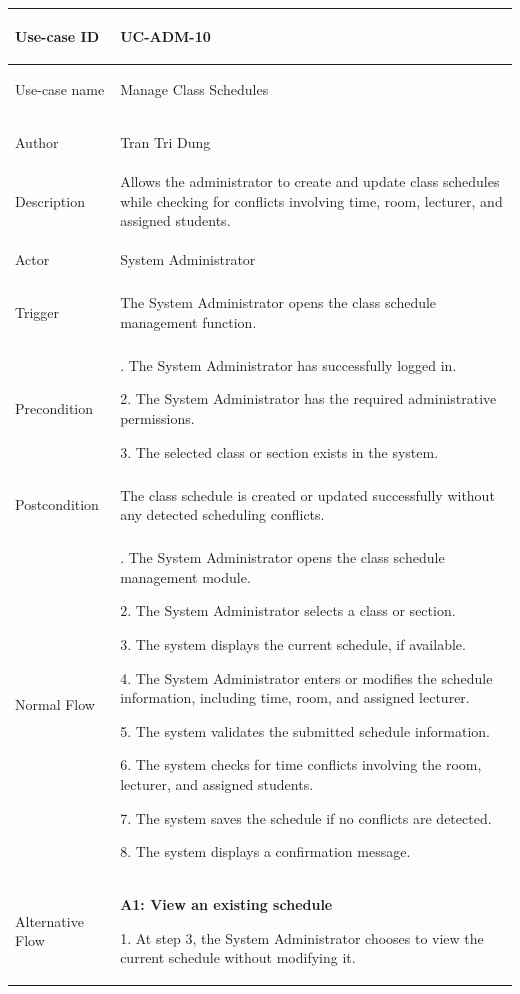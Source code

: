 \begin{longtable}{|>{\bfseries\raggedright\arraybackslash}p{}|>{\raggedright\arraybackslash}p{}|}
\hline
Use-case ID & UC-ADM-10 \\ \hline
Use-case name & Manage Class Schedules \\ \hline
Author & Tran Tri Dung \\ \hline
Description & Allows the administrator to create and update class schedules while checking for conflicts involving time, room, lecturer, and assigned students. \\ \hline
Actor & System Administrator \\ \hline
Trigger & The System Administrator opens the class schedule management function. \\ \hline
Precondition &
1. The System Administrator has successfully logged in. \par
2. The System Administrator has the required administrative permissions. \par
3. The selected class or section exists in the system. \\ \hline
Postcondition & The class schedule is created or updated successfully without any detected scheduling conflicts. \\ \hline
Normal Flow &
1. The System Administrator opens the class schedule management module. \par
2. The System Administrator selects a class or section. \par
3. The system displays the current schedule, if available. \par
4. The System Administrator enters or modifies the schedule information, including time, room, and assigned lecturer. \par
5. The system validates the submitted schedule information. \par
6. The system checks for time conflicts involving the room, lecturer, and assigned students. \par
7. The system saves the schedule if no conflicts are detected. \par
8. The system displays a confirmation message. \\ \hline
Alternative Flow &
\textbf{A1: View an existing schedule} \par
1. At step 3, the System Administrator chooses to view the current schedule without modifying it. \par

\end{longtable}
